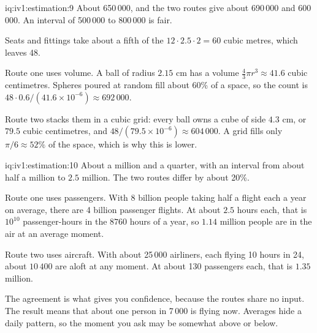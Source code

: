 \begin{solution}{iq:iv1:estimation:9}
About 650\,000, and the two routes give about 690\,000 and 600\,000. An interval of 500\,000 to 800\,000 is fair.

Seats and fittings take about a fifth of the $12 \cdot 2.5 \cdot 2 = 60$ cubic metres, which leaves 48.

Route one uses volume. A ball of radius $2.15$ cm has a volume $\tfrac43 \pi r^3 \approx 41.6$ cubic centimetres. Spheres poured at random fill about 60\% of a space, so the count is $48 \cdot 0.6/(41.6 \times 10^{-6}) \approx 692\,000$.

Route two stacks them in a cubic grid: every ball owns a cube of side $4.3$ cm, or $79.5$ cubic centimetres, and $48/(79.5 \times 10^{-6}) \approx 604\,000$. A grid fills only $\pi/6 \approx 52\%$ of the space, which is why this is lower.

\end{solution}

\begin{solution}{iq:iv1:estimation:10}
About a million and a quarter, with an interval from about half a million to $2.5$ million. The two routes differ by about 20\%.

Route one uses passengers. With 8 billion people taking half a flight each a year on average, there are 4 billion passenger flights. At about $2.5$ hours each, that is $10^{10}$ passenger-hours in the $8760$ hours of a year, so $1.14$ million people are in the air at an average moment.

Route two uses aircraft. With about 25\,000 airliners, each flying 10 hours in 24, about $10\,400$ are aloft at any moment. At about 130 passengers each, that is $1.35$ million.

The agreement is what gives you confidence, because the routes share no input. The result means that about one person in 7\,000 is flying now. Averages hide a daily pattern, so the moment you ask may be somewhat above or below.

\end{solution}

